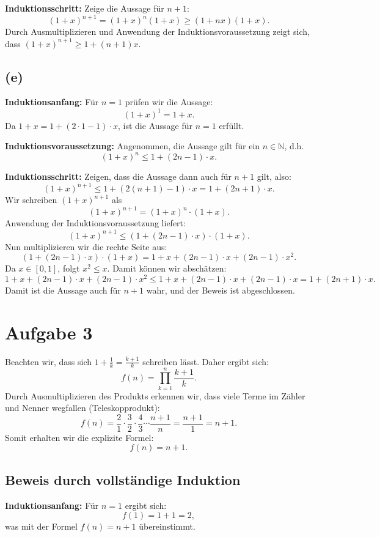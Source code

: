 \documentclass[a4paper]{scrartcl}
\begin{document}
\textbf{Induktionsschritt:} Zeige die Aussage für \( n+1 \):
\[
(1 + x)^{n+1} = (1 + x)^n (1 + x) \geq (1 + nx)(1 + x).
\]
Durch Ausmultiplizieren und Anwendung der Induktionsvoraussetzung zeigt sich, dass \( (1 + x)^{n+1} \geq 1 + (n+1)x \).

\subsection*{(e)}
\textbf{Induktionsanfang:} Für \( n = 1 \) prüfen wir die Aussage:
\[
(1 + x)^1 = 1 + x.
\]
Da \( 1 + x = 1 + (2 \cdot 1 - 1) \cdot x \), ist die Aussage für \( n = 1 \) erfüllt.

\textbf{Induktionsvoraussetzung:} Angenommen, die Aussage gilt für ein \( n \in \mathbb{N} \), d.h.
\[
(1 + x)^n \leq 1 + (2n - 1) \cdot x.
\]

\textbf{Induktionsschritt:} Zeigen, dass die Aussage dann auch für \( n+1 \) gilt, also:
\[
(1 + x)^{n+1} \leq 1 + (2(n+1) - 1) \cdot x = 1 + (2n + 1) \cdot x.
\]
Wir schreiben \( (1 + x)^{n+1} \) als
\[
(1 + x)^{n+1} = (1 + x)^n \cdot (1 + x).
\]
Anwendung der Induktionsvoraussetzung liefert:
\[
(1 + x)^{n+1} \leq \left( 1 + (2n - 1) \cdot x \right) \cdot (1 + x).
\]
Nun multiplizieren wir die rechte Seite aus:
\[
(1 + (2n - 1) \cdot x) \cdot (1 + x) = 1 + x + (2n - 1) \cdot x + (2n - 1) \cdot x^2.
\]
Da \( x \in [0, 1] \), folgt \( x^2 \leq x \). Damit können wir abschätzen:
\[
1 + x + (2n - 1) \cdot x + (2n - 1) \cdot x^2 \leq 1 + x + (2n - 1) \cdot x + (2n - 1) \cdot x = 1 + (2n + 1) \cdot x.
\]
Damit ist die Aussage auch für \( n+1 \) wahr, und der Beweis ist abgeschlossen.

\section*{Aufgabe 3}

Beachten wir, dass sich \( 1 + \frac{1}{k} = \frac{k+1}{k} \) schreiben lässt. Daher ergibt sich:
\[
f(n) = \prod_{k=1}^n \frac{k+1}{k}.
\]
Durch Ausmultiplizieren des Produkts erkennen wir, dass viele Terme im Zähler und Nenner wegfallen (Teleskopprodukt):
\[
f(n) = \frac{2}{1} \cdot \frac{3}{2} \cdot \frac{4}{3} \cdots \frac{n+1}{n} = \frac{n+1}{1} = n+1.
\]
Somit erhalten wir die explizite Formel:
\[
f(n) = n + 1.
\]

\subsection*{Beweis durch vollständige Induktion}
\textbf{Induktionsanfang:} Für \( n = 1 \) ergibt sich:
\[
f(1) = 1 + 1 = 2,
\]
was mit der Formel \( f(n) = n + 1 \) übereinstimmt.
\end{document}
